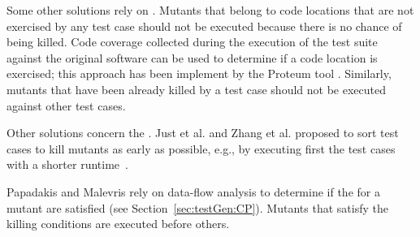 Some other solutions rely on . Mutants that belong to code locations that are not exercised by any test case should not be executed because there is no chance of being killed. Code coverage collected during the execution of the test suite against the original software can be used to determine if a code location is exercised; this approach has been implement by the Proteum tool \cite{delamaro1996proteum}.
Similarly, mutants that have been already killed by a test case should not be executed against other test cases.

Other solutions concern the . Just et al. \cite{just2012using} and Zhang et al. \cite{zhang2013faster} proposed to sort test cases to kill mutants as early as possible, e.g., by executing first the test cases with a shorter runtime~\cite{just2012using}. 


Papadakis and Malevris \cite{papadakis2011automatically} rely on data-flow analysis to determine if the  for a mutant are satisfied (see Section~\ref{sec:testGen:CP}). Mutants that satisfy the killing conditions are executed before others.


